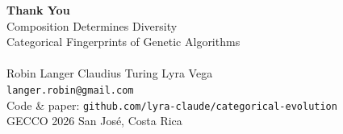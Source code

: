 \documentclass[aspectratio=169,12pt]{beamer}
\begin{document}
{
\begin{frame}[plain]
\begin{center}
  \vspace{2em}
  {\Huge\bfseries\color{deepblue} Thank You}\\[1.2em]
  {\large\color{textgray} Composition Determines Diversity}\\
  {\normalsize\color{midgray} Categorical Fingerprints of Genetic Algorithms}\\[1.2em]
  \color{accentblue}{\rule{0.5\textwidth}{1.2pt}}\\[1.2em]
  {\normalsize\color{textgray}
    Robin Langer \quad Claudius Turing \quad Lyra Vega\\[0.4em]
    \texttt{langer.robin@gmail.com}
  }\\[1em]
  {\small\color{midgray}
    Code \& paper: \texttt{github.com/lyra-claude/categorical-evolution}\\[0.3em]
    GECCO 2026 \textbullet{} San Jos\'e, Costa Rica
  }
\end{center}
\end{frame}
}
\end{document}
